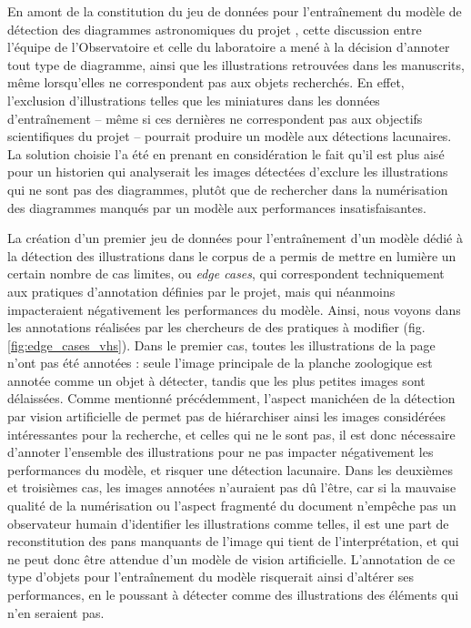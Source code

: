En amont de la constitution du jeu de données pour l'entraînement du modèle de détection des diagrammes astronomiques du projet \eida, cette discussion entre l'équipe de l'Observatoire et celle du laboratoire \imagine a mené à la décision d'annoter tout type de diagramme, ainsi que les illustrations retrouvées dans les manuscrits, même lorsqu'elles ne correspondent pas aux objets recherchés. En effet, l'exclusion d'illustrations telles que les miniatures dans les données d'entraînement -- même si ces dernières ne correspondent pas aux objectifs scientifiques du projet -- pourrait produire un modèle aux détections lacunaires. La solution choisie l'a été en prenant en considération le fait qu'il est plus aisé pour un historien qui analyserait les images détectées d'exclure les illustrations qui ne sont pas des diagrammes, plutôt que de rechercher dans la numérisation des diagrammes manqués par un modèle aux performances insatisfaisantes.

La création d'un premier jeu de données pour l'entraînement d'un modèle dédié à la détection des illustrations dans le corpus de \vhs a permis de mettre en lumière un certain nombre de cas limites, ou \textit{edge cases}, qui correspondent techniquement aux pratiques d'annotation définies par le projet, mais qui néanmoins impacteraient négativement les performances du modèle. Ainsi, nous voyons dans les annotations réalisées par les chercheurs de \vhs des pratiques à modifier (fig. \ref{fig:edge_cases_vhs}). Dans le premier cas, toutes les illustrations de la page n'ont pas été annotées : seule l'image principale de la planche zoologique est annotée comme un objet à détecter, tandis que les plus petites images sont délaissées. Comme mentionné précédemment, l'aspect manichéen de la détection par vision artificielle de permet pas de hiérarchiser ainsi les images considérées intéressantes pour la recherche, et celles qui ne le sont pas, il est donc nécessaire d'annoter l'ensemble des illustrations pour ne pas impacter négativement les performances du modèle, et risquer une détection lacunaire. Dans les deuxièmes et troisièmes cas, les images annotées n'auraient pas dû l'être, car si la mauvaise qualité de la numérisation ou l'aspect fragmenté du document n'empêche pas un observateur humain d'identifier les illustrations comme telles, il est une part de reconstitution des pans manquants de l'image qui tient de l'interprétation, et qui ne peut donc être attendue d'un modèle de vision artificielle. L'annotation de ce type d'objets pour l'entraînement du modèle risquerait ainsi d'altérer ses performances, en le poussant à détecter comme des illustrations des éléments qui n'en seraient pas.

